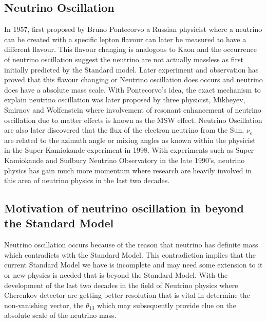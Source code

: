 \documentclass[11pt ,a4paper]{article}
\begin{document}
\subsection*{Neutrino Oscillation}
In 1957, first proposed by Bruno Pontecorvo a Russian physicist where a neutrino can be created with a specific lepton flavour can later be measured to have a different flavour.\cite{bruno}\cite{wolf} This flavour changing is analogous to Kaon and the occurrence of neutrino oscillation suggest the neutrino are not actually massless as first initially predicted by the Standard model. Later experiment and observation has proved that this flavour changing or Neutrino oscillation does occurs and neutrino does have a absolute mass scale. With Pontecorvo's idea, the exact mechanism to explain neutrino oscillation was later proposed by three physicist, Mikheyev, Smirnov and Wolfenstein where involvement of resonant enhancement of neutrino oscillation due to matter effects is known as the MSW effect.\cite{massmodel} Neutrino Oscillation are also later discovered that the flux of the electron neutrino from the Sun, \(\nu_e \) are related to the azimuth angle or mixing angles as known within the physicist in the Super-Kamiokande experiment in 1998.\cite{king07} With experiments such as Super-Kamiokande and Sudbury Neutrino Observatory in the late 1990's, neutrino physics has gain much more momentum where research are heavily involved in this area of neutrino physics in the last two decades.
\subsection*{Motivation of neutrino oscillation in beyond the Standard Model}
Neutrino oscillation occurs because of the reason that neutrino has definite mass which contradicts with the Standard Model. This contradiction implies that the current Standard Model we have is incomplete and may need some extension to it or new physics is needed that is beyond the Standard Model. With the development of the last two decades in the field of Neutrino physics where Cherenkov detector are getting better resolution that is vital in determine the non-vanishing vector, the \(\theta_{13} \) which may subsequently provide clue on the absolute scale of the neutrino mass.
\end{document}
